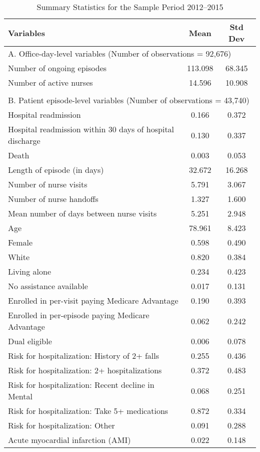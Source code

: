 \documentclass[final,12pt, notitlepage]{article}
\begin{document}
\begin{singlespace}
\newpage
{\footnotesize
\begin{longtable}{lcc}
\caption{Summary Statistics for the Sample Period 2012--2015}
\label{tab:summstats}\\
\toprule
Variables & Mean & Std Dev \\
\midrule
\multicolumn{3}{l}{A. Office-day-level variables (Number of observations = 92,676)} \\
Number of ongoing episodes  &  113.098 & 68.345 \\
Number of active nurses      & 14.596   & 10.908 \\
\\
\multicolumn{3}{l}{B. Patient episode-level variables (Number of observations = 43,740)} \\
Hospital readmission & 0.166 & 0.372 \\
Hospital readmission within 30 days of hospital discharge & 0.130 & 0.337 \\
Death & 0.003 & 0.053 \\
Length of episode (in days) & 32.672 & 16.268 \\
Number of nurse visits & 5.791 & 3.067 \\
Number of nurse handoffs & 1.327 & 1.600 \\
Mean number of days between nurse visits & 5.251 & 2.948 \\
Age & 78.961 & 8.423 \\
Female & 0.598 & 0.490 \\
White & 0.820 & 0.384 \\
Living alone & 0.234 & 0.423 \\
No assistance available & 0.017 & 0.131 \\
Enrolled in per-visit paying Medicare Advantage & 0.190 & 0.393 \\
Enrolled in per-episode paying Medicare Advantage & 0.062 & 0.242 \\
Dual eligible & 0.006 & 0.078 \\
Risk for hospitalization: History of 2+ falls & 0.255 & 0.436 \\
Risk for hospitalization: 2+ hospitalizations & 0.372 & 0.483 \\
Risk for hospitalization: Recent decline in Mental & 0.068 & 0.251 \\
Risk for hospitalization: Take 5+ medications & 0.872 & 0.334 \\
Risk for hospitalization: Other & 0.091 & 0.288 \\
Acute myocardial infarction (AMI) & 0.022 & 0.148 \\

\end{longtable}}
\end{singlespace}
\end{document}
